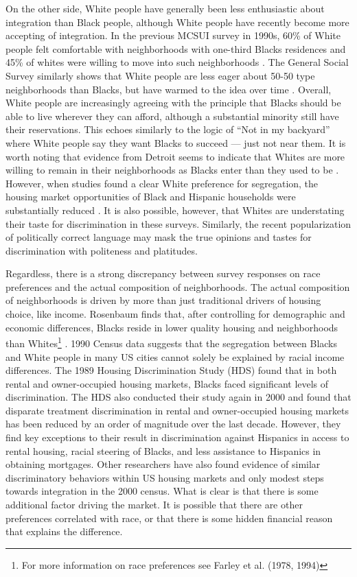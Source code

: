 \documentclass[11pt]{asaproc}
\newcommand{\1}{\mathbb{1}}
\begin{document}
On the other side, White people have generally been less enthusiastic about integration than Black people, although White people have recently become more accepting of integration. In the previous MCSUI survey in 1990s, 60\% of White people felt comfortable with neighborhoods with one-third Blacks residences and 45\% of whites were willing to move into such neighborhoods \citep{charles03}. The General Social Survey similarly shows that White people are less eager about 50-50 type neighborhoods than Blacks, but have warmed to the idea over time \citep{schuman97}. Overall, White people are increasingly agreeing with the principle that Blacks should be able to live wherever they can afford, although a substantial minority still have their reservations\citep{schuman97,bobo01}. This echoes similarly to the logic of ``Not in my backyard'' where White people say they want Blacks to succeed --- just not near them. It is worth noting that evidence from Detroit seems to indicate that Whites are more willing to remain in their neighborhoods as Blacks enter than they used to be \citep{farley94}. However, when studies found a clear White preference for segregation, the housing market opportunities of Black and Hispanic households were substantially reduced \citep{farley94,bobo96,charles00}. It is also possible, however, that Whites are understating their taste for discrimination in these surveys. Similarly, the recent popularization of politically correct language may mask the true opinions and tastes for discrimination with politeness and platitudes.

Regardless, there is a strong discrepancy between survey responses on race preferences and the actual composition of neighborhoods. The actual composition of neighborhoods is driven by more than just traditional drivers of housing choice, like income. Rosenbaum finds that, after controlling for demographic and economic differences, Blacks reside in lower quality housing and neighborhoods than Whites\footnote{For more information on race preferences see Farley et al. (1978, 1994)\citep{farley78,farley94,farley94b}} \citep{rosenbaum99}. 1990 Census data suggests that the segregation between Blacks and White people in many US cities cannot solely be explained by racial income differences\citep{massey93}. The 1989 Housing Discrimination Study (HDS) found that in both rental and owner-occupied housing markets, Blacks faced significant levels of discrimination\citep{yinger95}. The HDS also conducted their study again in 2000 and found that disparate treatment discrimination in rental and owner-occupied housing markets has been reduced by an order of magnitude over the last decade. However, they find key exceptions to their result in discrimination against Hispanics in access to rental housing, racial steering of Blacks, and less assistance to Hispanics in obtaining mortgages. Other researchers have also found evidence of similar discriminatory behaviors within US housing markets and only modest steps towards integration in the 2000 census\citep{glaeser00,ross05a,turner05}. What is clear is that there is some additional factor driving the market. It is possible that there are other preferences correlated with race, or that there is some hidden financial reason that explains the difference. 
\end{document}
